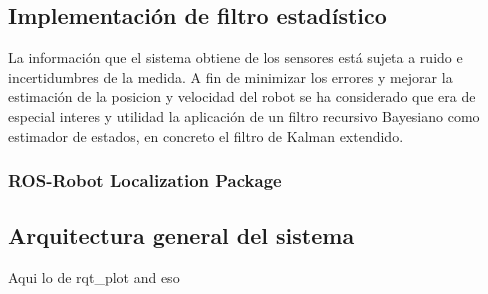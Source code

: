 \subsection{Implementación de filtro estadístico}
La información que el sistema obtiene de los sensores está sujeta a ruido e incertidumbres de la medida. A fin de minimizar los errores y mejorar la estimación de la posicion y velocidad del robot se ha 
considerado que era de especial interes y utilidad la aplicación de un filtro recursivo Bayesiano como estimador de estados, en concreto el filtro de Kalman extendido.
\subsubsection{ROS-Robot Localization Package}

\subsection{Arquitectura general del sistema}
Aqui lo de rqt\_plot and eso
